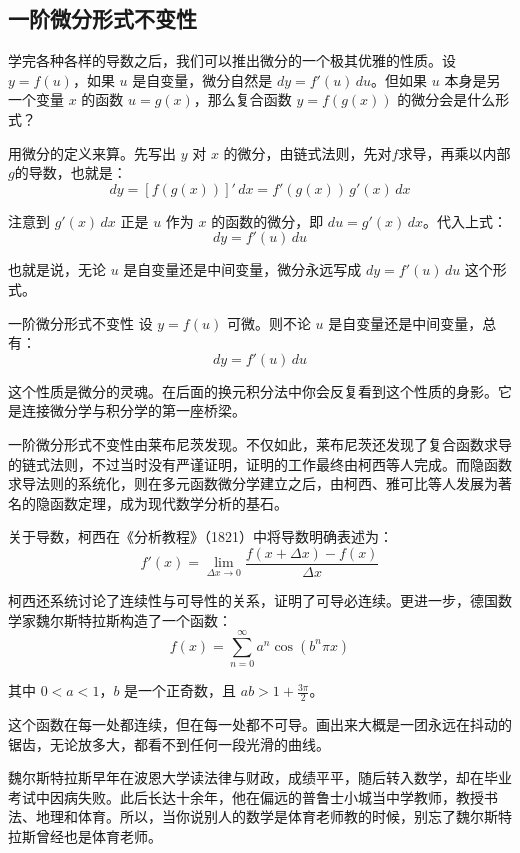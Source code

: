 \subsection{一阶微分形式不变性}

学完各种各样的导数之后，我们可以推出微分的一个极其优雅的性质。设 $y = f(u)$，如果 $u$ 是自变量，微分自然是 $dy = f'(u)\,du$。但如果 $u$ 本身是另一个变量 $x$ 的函数 $u = g(x)$，那么复合函数 $y = f(g(x))$ 的微分会是什么形式？

用微分的定义来算。先写出 $y$ 对 $x$ 的微分，由链式法则，先对$f$求导，再乘以内部$g$的导数，也就是：
\[
dy = [f(g(x))]'\, dx = f'(g(x))\, g'(x)\, dx
\]

注意到 $g'(x)\, dx$ 正是 $u$ 作为 $x$ 的函数的微分，即 $du = g'(x)\, dx$。代入上式：
\[
dy = f'(u)\, du
\]

也就是说，无论 $u$ 是自变量还是中间变量，微分永远写成 $dy = f'(u)\, du$ 这个形式。

\begin{theorem}{一阶微分形式不变性}{}
设 $y = f(u)$ 可微。则不论 $u$ 是自变量还是中间变量，总有：
\[
dy = f'(u)\, du
\]
\end{theorem}

这个性质是微分的灵魂。在后面的换元积分法中你会反复看到这个性质的身影。它是连接微分学与积分学的第一座桥梁。

一阶微分形式不变性由莱布尼茨发现。不仅如此，莱布尼茨还发现了复合函数求导的链式法则，不过当时没有严谨证明，证明的工作最终由柯西等人完成。而隐函数求导法则的系统化，则在多元函数微分学建立之后，由柯西、雅可比等人发展为著名的隐函数定理，成为现代数学分析的基石。

关于导数，柯西在《分析教程》（1821）中将导数明确表述为：
\[
f'(x) = \lim_{\Delta x \to 0} \frac{f(x+\Delta x)-f(x)}{\Delta x}
\]

柯西还系统讨论了连续性与可导性的关系，证明了可导必连续。更进一步，德国数学家魏尔斯特拉斯构造了一个函数：
\[
f(x) = \sum_{n=0}^{\infty} a^n \cos(b^n \pi x)
\]

其中 \(0 < a < 1\)，\(b\) 是一个正奇数，且 \(ab > 1 + \frac{3\pi}{2}\)。

这个函数在每一处都连续，但在每一处都不可导。画出来大概是一团永远在抖动的锯齿，无论放多大，都看不到任何一段光滑的曲线。

魏尔斯特拉斯早年在波恩大学读法律与财政，成绩平平，随后转入数学，却在毕业考试中因病失败。此后长达十余年，他在偏远的普鲁士小城当中学教师，教授书法、地理和体育。所以，当你说别人的数学是体育老师教的时候，别忘了魏尔斯特拉斯曾经也是体育老师。